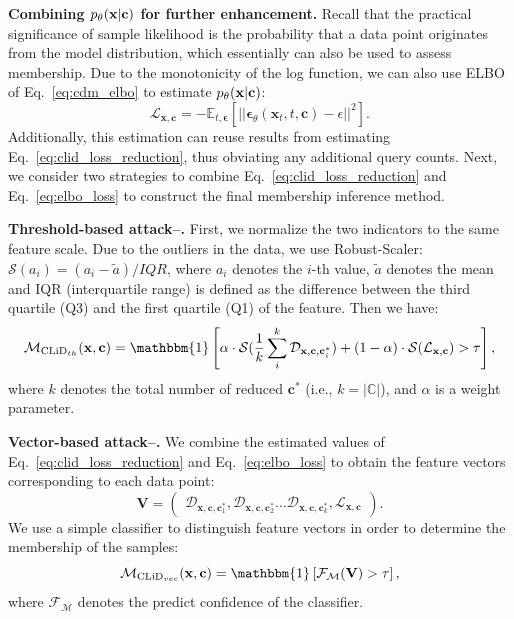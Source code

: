 \textbf{Combining $p_\theta(\mathbf{x}|\mathbf{c})$ for further enhancement.}
Recall that the practical significance of sample likelihood is the probability that a data point originates from the model distribution, which essentially can also be used to assess membership.
Due to the monotonicity of the log function, we can also use ELBO of Eq.~\eqref{eq:cdm_elbo} to estimate $p_\theta(\mathbf{x}|\mathbf{c})$:
\begin{equation}\label{eq:elbo_loss}
    \mathcal{L}_{\mathbf{x},\mathbf{c}} = - \mathbb{E}_{ t, \mathbf{\epsilon}} \left[|| \mathbf{\epsilon}_{\theta}( \mathbf{x}_t    , t, \mathbf{c}) - \epsilon ||^2 \right].
\end{equation}
Additionally, this estimation can reuse results from estimating Eq.~\eqref{eq:clid_loss_reduction}, thus obviating any additional query counts. Next, we consider two strategies to combine Eq.~\eqref{eq:clid_loss_reduction} and Eq.~\eqref{eq:elbo_loss} to construct the final membership inference method.

\textbf{Threshold-based attack--\clidth.}
First, we normalize the two indicators to the same feature scale. Due to the outliers in the data, we use Robust-Scaler: $\mathcal{S}(a_{i}) = (a_{i} - \tilde{a}) \big/ IQR $, where $a_{i}$ denotes the $i$-th value,  $\tilde{a}$ denotes the mean and IQR (interquartile range) is defined as the difference between the third quartile (Q3) and the first quartile (Q1) of the feature. Then we have:
\begin{equation}\label{eq:mi_th}
     \mathcal{M}_{\text{CLiD}_{th}}(\mathbf{x},\mathbf{c}) = \mathbbm{1} \left[
     \alpha \cdot \mathcal{S}(\frac{1}{k} \sum_{i}^{k}  \mathcal{D}_{\mathbf{x},\mathbf{c},\mathbf{c}^*_i})
     +
 (1-\alpha) \cdot \mathcal{S}(\mathcal{L}_{\mathbf{x},\mathbf{c}}) 
 > \tau  \right],
\end{equation}
where $k$ denotes the total number of reduced $\mathbf{c}^*$ (i.e., $k =  \left| \mathbb{C} \right|$),  and $\alpha$ is a weight parameter. 


\textbf{Vector-based attack--\clidvec.}
We combine the estimated values of Eq.~\eqref{eq:clid_loss_reduction} and Eq.~\eqref{eq:elbo_loss} to obtain the feature vectors corresponding to each data point:
\begin{equation}\label{eq:vec}
    \mathbf{V} = 
\begin{pmatrix}
\mathcal{D}_{\mathbf{x},\mathbf{c},\mathbf{c}^*_1},
\mathcal{D}_{\mathbf{x},\mathbf{c},\mathbf{c}^*_2} 
\hdots
\mathcal{D}_{\mathbf{x},\mathbf{c},\mathbf{c}^*_k},
\mathcal{L}_{\mathbf{x},\mathbf{c}}
\end{pmatrix}.
\end{equation}
We use a simple classifier to distinguish feature vectors in order to determine the membership of the samples: 
\begin{equation}\label{eq:mi_vec}
\mathcal{M}_{\text{CLiD}_{vec}}(\mathbf{x},\mathbf{c}) = \mathbbm{1} \left[
\mathcal{F}_{\mathcal{M}} %
(
\mathbf{V}
)
> \tau  \right],
\end{equation}
where $\mathcal{F}_{\mathcal{M}}$ denotes the predict confidence of the classifier. 




